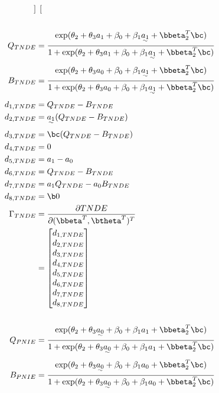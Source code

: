 \documentclass[dvipdfmx,10pt]{article}
\begin{document}
\begin{align*}
\begin{bmatrix}
    \end{bmatrix}\\
  \\
  Q_{TNDE} &= \frac
             {    \exp(\theta_{2} + \theta_{3}a_{1} + \beta_{0} + \beta_{1}\uwave{a_{1}} + \bbeta_{2}^{T}\bc)}
             {1 + \exp(\theta_{2} + \theta_{3}a_{1} + \beta_{0} + \beta_{1}\uwave{a_{1}} + \bbeta_{2}^{T}\bc)}\\
  B_{TNDE} &= \frac
             {    \exp(\theta_{2} + \theta_{3}a_{0} + \beta_{0} + \beta_{1}\uwave{a_{1}} + \bbeta_{2}^{T}\bc)}
             {1 + \exp(\theta_{2} + \theta_{3}a_{0} + \beta_{0} + \beta_{1}\uwave{a_{1}} + \bbeta_{2}^{T}\bc)}\\
      d_{1,TNDE} &= Q_{TNDE} - B_{TNDE}\\
      d_{2,TNDE} &= \uwave{a_{1}} (Q_{TNDE} - B_{TNDE})\\
      d_{3,TNDE} &= \bc (Q_{TNDE} - B_{TNDE})\\
      d_{4,TNDE} &= 0\\
      d_{5,TNDE} &= a_{1} - a_{0}\\
      d_{6,TNDE} &= Q_{TNDE} - B_{TNDE}\\
      d_{7,TNDE} &= a_{1}Q_{TNDE} - a_{0}B_{TNDE}\\
      d_{8,TNDE} &= \b0\\
  \Gamma_{TNDE}
  &= \frac{\partial TNDE}{\partial (\bbeta^{T},\btheta^{T})^{T}}\\
  &= \begin{bmatrix}
      d_{1,TNDE}\\
      d_{2,TNDE}\\
      d_{3,TNDE}\\
      d_{4,TNDE}\\
      d_{5,TNDE}\\
      d_{6,TNDE}\\
      d_{7,TNDE}\\
      d_{8,TNDE}\\
    \end{bmatrix}\\
  \\
  Q_{PNIE} &= \frac
      {    \exp(\theta_{2} + \theta_{3}\uwave{a_{0}} + \beta_{0} + \beta_{1}a_{1} + \bbeta_{2}^{T}\bc)}
      {1 + \exp(\theta_{2} + \theta_{3}\uwave{a_{0}} + \beta_{0} + \beta_{1}a_{1} + \bbeta_{2}^{T}\bc)}\\
  B_{PNIE} &= \frac
      {    \exp(\theta_{2} + \theta_{3}\uwave{a_{0}} + \beta_{0} + \beta_{1}a_{0} + \bbeta_{2}^{T}\bc)}
      {1 + \exp(\theta_{2} + \theta_{3}\uwave{a_{0}} + \beta_{0} + \beta_{1}a_{0} + \bbeta_{2}^{T}\bc)}\\

\end{align*}
\end{document}
